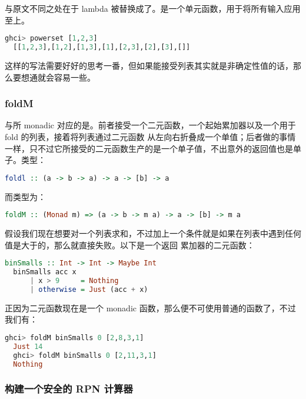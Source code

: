 \documentclass[./main.tex]{subfiles}
\begin{document}
与原文不同之处在于 lambda 被替换成了。是一个单元函数，用于将所有输入应用至上。

\begin{lstlisting}[language=Haskell]
  ghci> powerset [1,2,3]
  [[1,2,3],[1,2],[1,3],[1],[2,3],[2],[3],[]]
\end{lstlisting}

这样的写法需要好好的思考一番，但如果能接受列表其实就是非确定性值的话，那么要想通就会容易一些。

\subsubsection*{foldM}

与所 monadic 对应的是。前者接受一个二元函数，一个起始累加器以及一个用于 fold 的列表，接着将列表通过二元函数
从左向右折叠成一个单值；后者做的事情一样，只不过它所接受的二元函数生产的是一个单子值，不出意外的返回值也是单子。类型：

\begin{lstlisting}[language=Haskell]
  foldl :: (a -> b -> a) -> a -> [b] -> a
\end{lstlisting}

而类型为：

\begin{lstlisting}[language=Haskell]
  foldM :: (Monad m) => (a -> b -> m a) -> a -> [b] -> m a
\end{lstlisting}

假设我们现在想要对一个列表求和，不过加上一个条件就是如果在列表中遇到任何值是大于的，那么就直接失败。以下是一个返回
累加器的二元函数：

\begin{lstlisting}[language=Haskell]
  binSmalls :: Int -> Int -> Maybe Int
  binSmalls acc x
      | x > 9     = Nothing
      | otherwise = Just (acc + x)
\end{lstlisting}

正因为二元函数现在是一个 monadic 函数，那么便不可使用普通的函数了，不过我们有：

\begin{lstlisting}[language=Haskell]
  ghci> foldM binSmalls 0 [2,8,3,1]
  Just 14
  ghci> foldM binSmalls 0 [2,11,3,1]
  Nothing
\end{lstlisting}

\subsubsection*{构建一个安全的 RPN 计算器}
\end{document}
